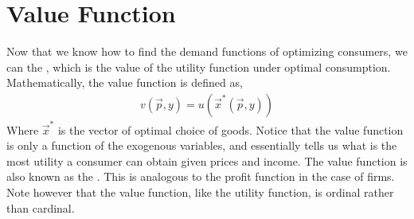 \section{Value Function}
Now that we know how to find the demand functions of optimizing consumers, we can the , which is the value of the utility function under optimal consumption. Mathematically, the value function is defined as,
\begin{align*}
    v(\vec{p}, y) = u(\vec{x}^*(\vec{p}, y))
\end{align*}
Where $\vec{x}^*$ is the vector of optimal choice of goods. Notice that the value function is only a function of the exogenous variables, and essentially tells us what is the most utility a consumer can obtain given prices and income. The value function is also known as the . This is analogous to the profit function in the case of firms. Note however that the value function, like the utility function, is ordinal rather than cardinal. 

